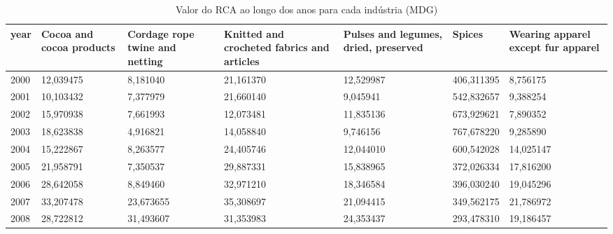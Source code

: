 \begin{table}
\centering
\caption{Valor do RCA ao longo dos anos para cada indústria (MDG)}
\begin{tabular}{p{1cm}p{2cm}p{2cm}p{2cm}p{2cm}p{2cm}p{2cm}}
\toprule
 year &  Cocoa and cocoa products &  Cordage rope twine and netting &  Knitted and crocheted fabrics and articles &  Pulses and legumes, dried, preserved &     Spices &  Wearing apparel except fur apparel \\
\midrule
 2000 &                 12,039475 &                        8,181040 &                                   21,161370 &                             12,529987 & 406,311395 &                            8,756175 \\
 2001 &                 10,103432 &                        7,377979 &                                   21,660140 &                              9,045941 & 542,832657 &                            9,388254 \\
 2002 &                 15,970938 &                        7,661993 &                                   12,073481 &                             11,835136 & 673,929621 &                            7,890352 \\
 2003 &                 18,623838 &                        4,916821 &                                   14,058840 &                              9,746156 & 767,678220 &                            9,285890 \\
 2004 &                 15,222867 &                        8,263577 &                                   24,405746 &                             12,044010 & 600,542028 &                           14,025147 \\
 2005 &                 21,958791 &                        7,350537 &                                   29,887331 &                             15,838965 & 372,026334 &                           17,816200 \\
 2006 &                 28,642058 &                        8,849460 &                                   32,971210 &                             18,346584 & 396,030240 &                           19,045296 \\
 2007 &                 33,207478 &                       23,673655 &                                   35,308697 &                             21,094415 & 349,562175 &                           21,786972 \\
 2008 &                 28,722812 &                       31,493607 &                                   31,353983 &                             24,353437 & 293,478310 &                           19,186457 \\

\end{tabular}
\end{table}
